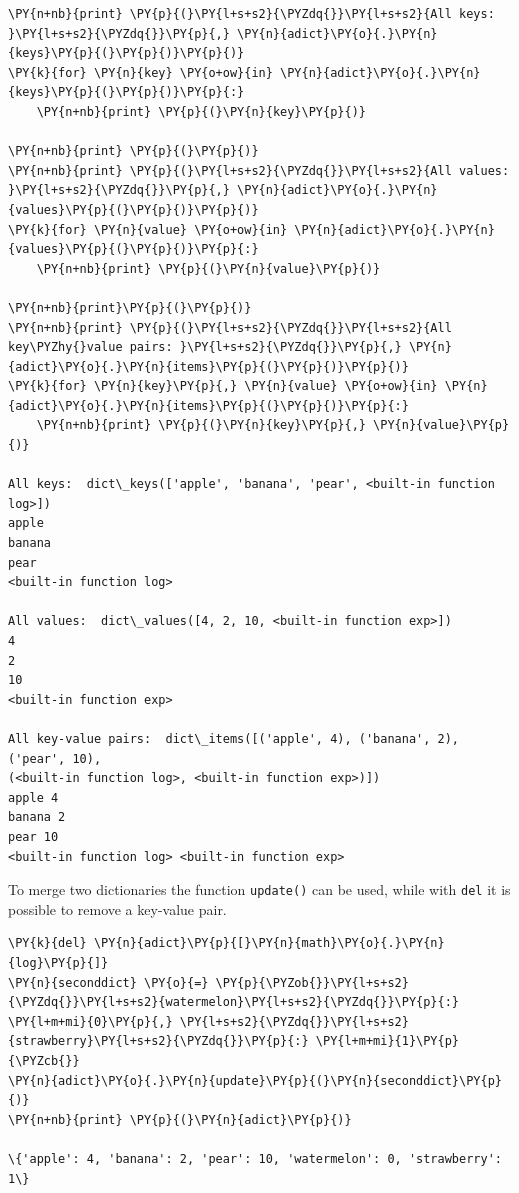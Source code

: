 \begin{tcolorbox}[breakable, size=fbox, boxrule=1pt, pad at break*=1mm, colback=cellbackground, colframe=cellborder]
\begin{Verbatim}[commandchars=\\\{\}]
\PY{n+nb}{print} \PY{p}{(}\PY{l+s+s2}{\PYZdq{}}\PY{l+s+s2}{All keys: }\PY{l+s+s2}{\PYZdq{}}\PY{p}{,} \PY{n}{adict}\PY{o}{.}\PY{n}{keys}\PY{p}{(}\PY{p}{)}\PY{p}{)}
\PY{k}{for} \PY{n}{key} \PY{o+ow}{in} \PY{n}{adict}\PY{o}{.}\PY{n}{keys}\PY{p}{(}\PY{p}{)}\PY{p}{:}
    \PY{n+nb}{print} \PY{p}{(}\PY{n}{key}\PY{p}{)}

\PY{n+nb}{print} \PY{p}{(}\PY{p}{)}
\PY{n+nb}{print} \PY{p}{(}\PY{l+s+s2}{\PYZdq{}}\PY{l+s+s2}{All values: }\PY{l+s+s2}{\PYZdq{}}\PY{p}{,} \PY{n}{adict}\PY{o}{.}\PY{n}{values}\PY{p}{(}\PY{p}{)}\PY{p}{)}
\PY{k}{for} \PY{n}{value} \PY{o+ow}{in} \PY{n}{adict}\PY{o}{.}\PY{n}{values}\PY{p}{(}\PY{p}{)}\PY{p}{:}
    \PY{n+nb}{print} \PY{p}{(}\PY{n}{value}\PY{p}{)}

\PY{n+nb}{print}\PY{p}{(}\PY{p}{)}
\PY{n+nb}{print} \PY{p}{(}\PY{l+s+s2}{\PYZdq{}}\PY{l+s+s2}{All key\PYZhy{}value pairs: }\PY{l+s+s2}{\PYZdq{}}\PY{p}{,} \PY{n}{adict}\PY{o}{.}\PY{n}{items}\PY{p}{(}\PY{p}{)}\PY{p}{)}
\PY{k}{for} \PY{n}{key}\PY{p}{,} \PY{n}{value} \PY{o+ow}{in} \PY{n}{adict}\PY{o}{.}\PY{n}{items}\PY{p}{(}\PY{p}{)}\PY{p}{:}
    \PY{n+nb}{print} \PY{p}{(}\PY{n}{key}\PY{p}{,} \PY{n}{value}\PY{p}{)}

All keys:  dict\_keys(['apple', 'banana', 'pear', <built-in function log>])
apple
banana
pear
<built-in function log>

All values:  dict\_values([4, 2, 10, <built-in function exp>])
4
2
10
<built-in function exp>

All key-value pairs:  dict\_items([('apple', 4), ('banana', 2), ('pear', 10),
(<built-in function log>, <built-in function exp>)])
apple 4
banana 2
pear 10
<built-in function log> <built-in function exp>
\end{Verbatim}
\end{tcolorbox}

To merge two dictionaries the function \texttt{update()} can be used, while with \texttt{del} it is possible to remove a key-value pair.

\begin{tcolorbox}[breakable, size=fbox, boxrule=1pt, pad at break*=1mm, colback=cellbackground, colframe=cellborder]
\begin{Verbatim}[commandchars=\\\{\}]
\PY{k}{del} \PY{n}{adict}\PY{p}{[}\PY{n}{math}\PY{o}{.}\PY{n}{log}\PY{p}{]}
\PY{n}{seconddict} \PY{o}{=} \PY{p}{\PYZob{}}\PY{l+s+s2}{\PYZdq{}}\PY{l+s+s2}{watermelon}\PY{l+s+s2}{\PYZdq{}}\PY{p}{:} \PY{l+m+mi}{0}\PY{p}{,} \PY{l+s+s2}{\PYZdq{}}\PY{l+s+s2}{strawberry}\PY{l+s+s2}{\PYZdq{}}\PY{p}{:} \PY{l+m+mi}{1}\PY{p}{\PYZcb{}}
\PY{n}{adict}\PY{o}{.}\PY{n}{update}\PY{p}{(}\PY{n}{seconddict}\PY{p}{)}
\PY{n+nb}{print} \PY{p}{(}\PY{n}{adict}\PY{p}{)}

\{'apple': 4, 'banana': 2, 'pear': 10, 'watermelon': 0, 'strawberry': 1\}
\end{Verbatim}
\end{tcolorbox}

